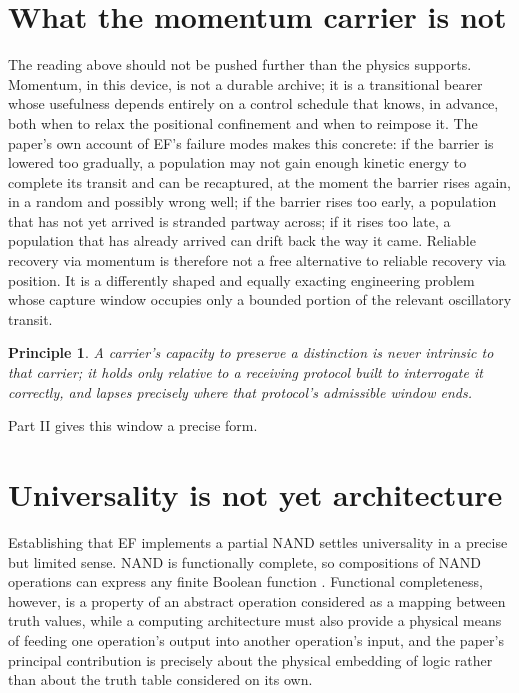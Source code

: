 \documentclass[11pt]{article}
\newtheorem{principle}{Principle}
\begin{document}
\section{What the momentum carrier is not}

The reading above should not be pushed further than the physics supports. Momentum, in this device, is not a durable archive; it is a transitional bearer whose usefulness depends entirely on a control schedule that knows, in advance, both when to relax the positional confinement and when to reimpose it. The paper's own account of EF's failure modes makes this concrete: if the barrier is lowered too gradually, a population may not gain enough kinetic energy to complete its transit and can be recaptured, at the moment the barrier rises again, in a random and possibly wrong well; if the barrier rises too early, a population that has not yet arrived is stranded partway across; if it rises too late, a population that has already arrived can drift back the way it came. Reliable recovery via momentum is therefore not a free alternative to reliable recovery via position. It is a differently shaped and equally exacting engineering problem whose capture window occupies only a bounded portion of the relevant oscillatory transit.

\begin{principle}
A carrier's capacity to preserve a distinction is never intrinsic to that carrier; it holds only relative to a receiving protocol built to interrogate it correctly, and lapses precisely where that protocol's admissible window ends.
\end{principle}

Part II gives this window a precise form.

\section{Universality is not yet architecture}

Establishing that EF implements a partial NAND settles universality in a precise but limited sense. NAND is functionally complete, so compositions of NAND operations can express any finite Boolean function \cite{LewisPapadimitriou1998}. Functional completeness, however, is a property of an abstract operation considered as a mapping between truth values, while a computing architecture must also provide a physical means of feeding one operation's output into another operation's input, and the paper's principal contribution is precisely about the physical embedding of logic rather than about the truth table considered on its own.
\end{document}
